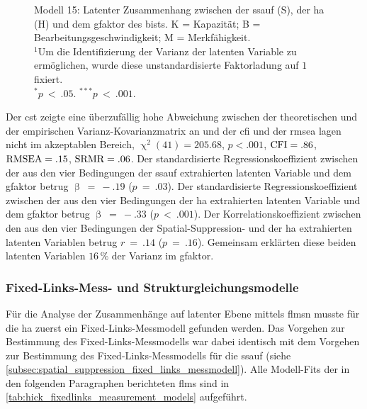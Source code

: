 \documentclass[11pt, twoside, a4paper]{book}		%
\begin{document}
\begin{figure}[b]
\begin{adjustbox}{width=1\textwidth, keepaspectratio}
\begin{tikzpicture}
		\end{tikzpicture}
	\end{adjustbox}
	\vspace{.2cm}
	\caption[Modell 15: Strukturgleichungsmodell zur Vorhersage des \gls{gfaktor}s durch die Spa\-ti\-al-Sup\-pres\-sion- und die \gls{ha}]{Modell 15: Latenter Zusammenhang zwischen der \gls{ssauf} (\textsf{S}), der \gls{ha} (\textsf{H}) und dem \gls{gfaktor} des \gls{bist}s. \textsf{K} = Kapazität; \textsf{B} = Bearbeitungsgeschwindigkeit; \textsf{M} = Merkfähigkeit.\\
		$^1$Um die Identifizierung der Varianz der latenten Variable zu ermöglichen, wurde diese unstandardisierte Faktorladung auf $1$ fixiert.\\
		$^{*}p~<~.05$. $^{***}p~<~.001$.}
	\label{fig:spatial_suppression_hick_g_model}
\end{figure}
Der \gls{cst} zeigte eine überzufällig hohe Abweichung zwischen der theoretischen und der empirischen Var\-ianz-Ko\-var\-ianz\-ma\-trix an und der \gls{cfi} und der \gls{rmsea} lagen nicht im akzeptablen Bereich, $\upchi^2(41)=205.68$, $p<.001$, $\textnormal{CFI}=.86$, $\textnormal{RMSEA}=.15$, $\textnormal{SRMR}=.06$. 
Der standardisierte Regressionskoeffizient zwischen der aus den vier Bedingungen der \gls{ssauf} extrahierten latenten Variable und dem \gls{gfaktor} betrug $\upbeta~=~-.19$ ($p~=~.03$). Der standardisierte Regressionskoeffizient zwischen der aus den vier Bedingungen der \gls{ha} extrahierten latenten Variable und dem \gls{gfaktor} betrug $\upbeta~=~-.33$ ($p~<~.001$). Der Korrelationskoeffizient zwischen den aus den vier Bedingungen der Spatial-Suppression- und der \gls{ha} extrahierten latenten Variablen betrug $r~=~.14$ ($p~=~.16$). Gemeinsam erklärten diese beiden latenten Variablen $16\,\%$ der Varianz im \gls{gfaktor}.



\subsubsection*{Fixed-Links-Mess- und Strukturgleichungsmodelle}

Für die Analyse der Zusammenhänge auf latenter Ebene mittels \glspl{flm}n musste für die \gls{ha} zuerst ein Fixed-Links\--Mess\-modell gefunden werden. Das Vorgehen zur Bestimmung des Fixed-Links-Mess\-mod\-el\-ls war dabei identisch mit dem Vorgehen zur Bestimmung des Fixed-Links-Mess\-mod\-el\-ls für die \gls{ssauf} (siehe \autoref{subsec:spatial_suppression_fixed_links_messmodell}). Alle Modell-Fits der in den folgenden Paragraphen berichteten \glspl{flm} sind in \autoref{tab:hick_fixedlinks_measurement_models} aufgeführt.
\end{document}
